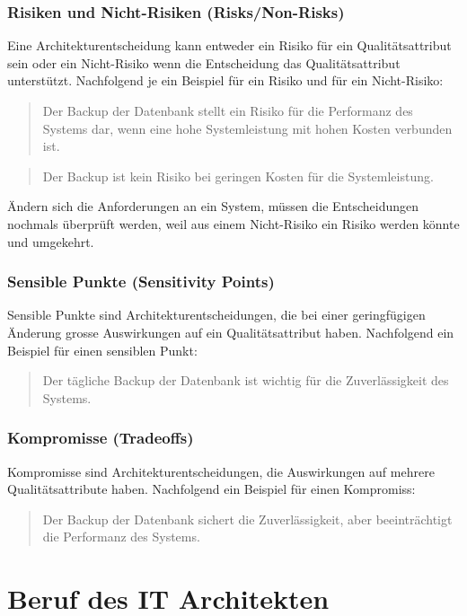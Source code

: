 \subsubsection{Risiken und Nicht-Risiken (Risks/Non-Risks)}

Eine Architekturentscheidung kann entweder ein Risiko für ein Qualitätsattribut sein oder ein Nicht-Risiko wenn die Entscheidung das Qualitätsattribut unterstützt. Nachfolgend je ein Beispiel für ein Risiko und für ein Nicht-Risiko:
\begin{quote}
	Der Backup der Datenbank stellt ein Risiko für die Performanz des Systems dar, wenn eine hohe Systemleistung mit hohen Kosten verbunden ist.
\end{quote}

\begin{quote}
	Der Backup ist kein Risiko bei geringen Kosten für die Systemleistung.
\end{quote}
Ändern sich die Anforderungen an ein System, müssen die Entscheidungen nochmals überprüft werden, weil aus einem Nicht-Risiko ein Risiko werden könnte und umgekehrt.

\subsubsection{Sensible Punkte (Sensitivity Points)}

Sensible Punkte sind Architekturentscheidungen, die bei einer geringfügigen Änderung grosse Auswirkungen auf ein Qualitätsattribut haben. Nachfolgend ein Beispiel für einen sensiblen Punkt:

\begin{quote}
	Der tägliche Backup der Datenbank ist wichtig für die Zuverlässigkeit des Systems.
\end{quote}

\subsubsection{Kompromisse (Tradeoffs)}

Kompromisse sind Architekturentscheidungen, die Auswirkungen auf mehrere Qualitätsattribute haben. Nachfolgend ein Beispiel für einen Kompromiss:

\begin{quote}
	Der Backup der Datenbank sichert die Zuverlässigkeit, aber beeinträchtigt die Performanz des Systems.
\end{quote}

\section{Beruf des IT Architekten}

